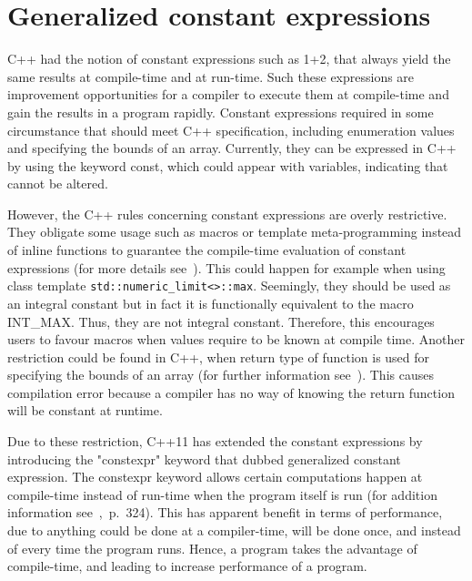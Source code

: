\documentclass[11pt]{report}
\begin{document}
\section{Generalized constant expressions}
\label{section: Generalized constant expressions}
C++ had the notion of constant expressions such as 1+2, that always yield the same results at compile-time and at run-time. Such these expressions are improvement opportunities for a compiler to execute them at compile-time and gain the results in a program rapidly. Constant expressions required in some circumstance that should meet C++ specification, including enumeration values and specifying the bounds of an array. Currently, they can be expressed in C++ by using the keyword const, which could appear with variables, indicating that cannot be altered.

However, the C++ rules concerning constant expressions are overly restrictive. They obligate some usage such as macros or template meta-programming instead of inline functions to guarantee the compile-time evaluation of constant expressions (for more details see~\cite{Stroustrup:2012:Cpp11}). This could happen for example when using class template \texttt{std::numeric\_limit<>::max}. Seemingly, they should be used as an integral constant but in fact it is functionally equivalent to the macro INT\_MAX. Thus, they are not integral constant. Therefore, this encourages users to favour macros when values require to be known at compile time. Another restriction could be found in C++, when return type of function is used for specifying the bounds of an array (for further information see~\cite{Stroustrup:2012:Cpp11}). This causes compilation error because a compiler has no way of knowing the return function will be constant at runtime.

Due to these restriction, C++11 has extended the constant expressions by introducing the "constexpr" keyword that dubbed generalized constant expression. The constexpr keyword allows certain computations happen at compile-time instead of run-time when the program itself is run (for addition information see~\cite{Williams:2012:CCA},~p.~324). This has apparent benefit in terms of performance, due to anything could be done at a compiler-time, will be done once, and instead of every time the program runs. Hence, a program takes the advantage of compile-time, and leading to increase performance of a program.
\end{document}

